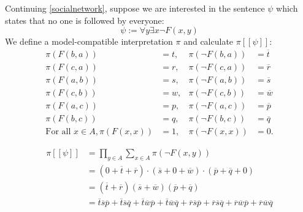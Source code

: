 \documentclass[oneside, 11pt]{amsbook}
\theoremstyle{plain}
\theoremstyle{definition}
\theoremstyle{remark}
\begin{document}
\begin{exmpl}
    Continuing \autoref{socialnetwork}, suppose we are interested in the sentence $\psi$ which states that no one is followed by everyone:
    \[
        \psi :=  \forall y \exists x \lnot F(x, y)
    \]
    We define a model-compatible interpretation $\pi$ and calculate $\pi [\![ \psi ]\!]$:
    \begin{align*}
        \pi(F(b,a))                          & =t, & \pi(\lnot F(b,a)) & =\overline{t} \\
        \pi(F(c,a))                          & =r, & \pi(\lnot F(c,a)) & =\overline{r} \\
        \pi(F(a,b))                          & =s, & \pi(\lnot F(a,b)) & =\overline{s} \\
        \pi(F(c,b))                          & =w, & \pi(\lnot F(c,b)) & =\overline{w} \\
        \pi(F(a,c))                          & =p, & \pi(\lnot F(a,c)) & =\overline{p} \\
        \pi(F(b,c))                          & =q, & \pi(\lnot F(b,c)) & =\overline{q} \\
        \text{For all } x \in A, \pi(F(x,x)) & =1, & \pi(\lnot F(x,x)) & =0.
    \end{align*}

    \begin{align*}
        \pi [\![ \psi ]\!] & = \prod_{y \in A} \sum_{x \in A} \pi(\neg F(x, y))                                                                                                                                                                                                                                                                      \\
                           & = (0 + \overline{t} + \overline{r}) \cdot (\overline{s} + 0 + \overline{w}) \cdot (\overline{p} + \overline{q} + 0)                                                                                                                                                                                                     \\
                           & = (\overline{t} + \overline{r})(\overline{s} + \overline{w})(\overline{p} + \overline{q})                                                                                                                                                                                                                               \\
                           & = \overline{t}\overline{s}\overline{p} + \overline{t}\overline{s}\overline{q} + \overline{t}\overline{w}\overline{p} + \overline{t}\overline{w}\overline{q} + \overline{r}\overline{s}\overline{p} + \overline{r}\overline{s}\overline{q} + \overline{r}\overline{w}\overline{p} + \overline{r}\overline{w}\overline{q}
    \end{align*}

\end{exmpl}
\end{document}
